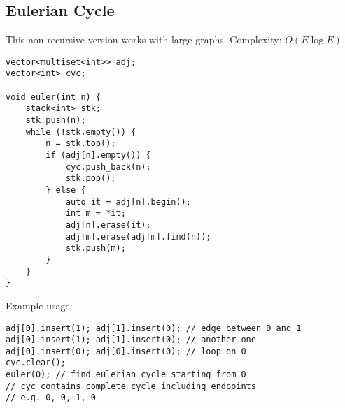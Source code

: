 \documentclass[letterpaper]{article}
\begin{document}
\subsection{Eulerian Cycle}

This non-recursive version works with large graphs. Complexity: $O(E\log E)$

\begin{lstlisting}
vector<multiset<int>> adj;
vector<int> cyc;

void euler(int n) {
	stack<int> stk;
	stk.push(n);
	while (!stk.empty()) {
		n = stk.top();
		if (adj[n].empty()) {
			cyc.push_back(n);
			stk.pop();
		} else {
			auto it = adj[n].begin();
			int m = *it;
			adj[n].erase(it);
			adj[m].erase(adj[m].find(n));
			stk.push(m);
		}
	}
}
\end{lstlisting}

Example usage:
\begin{lstlisting}
adj[0].insert(1); adj[1].insert(0); // edge between 0 and 1
adj[0].insert(1); adj[1].insert(0); // another one
adj[0].insert(0); adj[0].insert(0); // loop on 0
cyc.clear();
euler(0); // find eulerian cycle starting from 0
// cyc contains complete cycle including endpoints
// e.g. 0, 0, 1, 0
\end{lstlisting}
\end{document}

